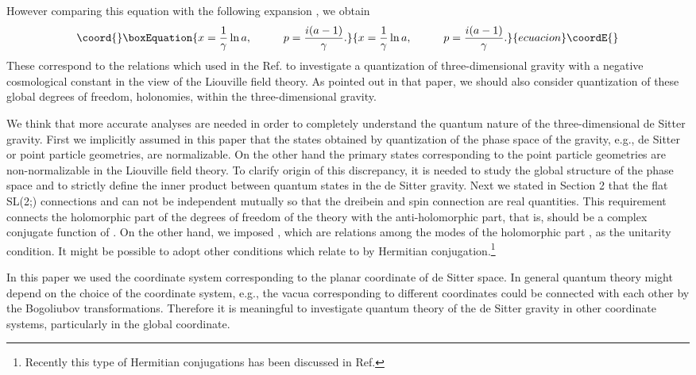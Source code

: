 \documentclass[a4paper,11pt]{article}
\begin{document}
However comparing this equation with the following expansion 
\coordHE{},  
we obtain 
\begin{equation}\coord{}\boxEquation{
x=\frac{1}{\gamma}\ln a, \hspace{10mm}
p=\frac{i(a-1)}{\gamma}.
}{
x=\frac{1}{\gamma}\ln a, \hspace{10mm}
p=\frac{i(a-1)}{\gamma}.
}{ecuacion}\coordE{}\end{equation}
These correspond to the relations which used in the Ref.\cite{NUY} to 
investigate a quantization of three-dimensional gravity 
with a negative cosmological constant in the view of 
the Liouville field theory.
As pointed out in that paper, we should also consider quantization of 
these global degrees of freedom, holonomies, 
within the three-dimensional gravity.

We think that more accurate analyses are needed in order to 
completely understand the quantum nature of the three-dimensional 
de Sitter gravity. 
First we implicitly assumed in this paper that 
the states obtained by quantization of the phase space of the gravity, 
e.g., de Sitter or point particle geometries,  
are normalizable.
On the other hand the primary states corresponding 
to the point particle geometries are non-normalizable
in the Liouville field theory.
To clarify origin of this discrepancy, it is needed 
to study the global structure of the phase space and 
to strictly define the inner product between quantum states 
in the de Sitter gravity.
Next we stated in Section 2 that the flat SL(2;\coordHE{}) 
connections \coordHE{} and \coordHE{} can not be independent mutually 
so that the dreibein and spin connection are real quantities.
This requirement connects the holomorphic part of the degrees 
of freedom of the theory with the anti-holomorphic part, that is, 
\coordHE{} should be a complex conjugate function of \coordHE{}.
On the other hand, we imposed \coordHE{}, 
which are relations among the modes of the holomorphic part \coordHE{},  
as the unitarity condition.
It might be possible to adopt other conditions 
which relate \coordHE{} to \coordHE{} 
by Hermitian conjugation.\footnote{
Recently this type of Hermitian conjugations has been discussed 
in Ref.\cite{BBM2}}

In this paper we used the coordinate system corresponding to 
the planar coordinate of de Sitter space.
In general quantum theory might depend on the choice of 
the coordinate system, 
e.g., the vacua corresponding to different coordinates could be 
connected with each other by the Bogoliubov transformations.
Therefore it is meaningful to investigate quantum theory of 
the de Sitter gravity in other coordinate systems, particularly 
in the global coordinate.
\end{document}
